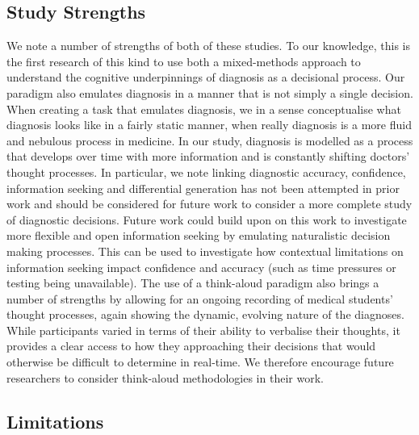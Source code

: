 \documentclass[a4paper, nobind]{templates/ociamthesis}
\begin{document}
\subsection*{Study Strengths}\label{study-strengths}

We note a number of strengths of both of these studies. To our knowledge, this is the first research of this kind to use both a mixed-methods approach to understand the cognitive underpinnings of diagnosis as a decisional process. Our paradigm also emulates diagnosis in a manner that is not simply a single decision. When creating a task that emulates diagnosis, we in a sense conceptualise what diagnosis looks like in a fairly static manner, when really diagnosis is a more fluid and nebulous process in medicine. In our study, diagnosis is modelled as a process that develops over time with more information and is constantly shifting doctors' thought processes. In particular, we note linking diagnostic accuracy, confidence, information seeking and differential generation has not been attempted in prior work and should be considered for future work to consider a more complete study of diagnostic decisions. Future work could build upon on this work to investigate more flexible and open information seeking by emulating naturalistic decision making processes. This can be used to investigate how contextual limitations on information seeking impact confidence and accuracy (such as time pressures or testing being unavailable). The use of a think-aloud paradigm also brings a number of strengths by allowing for an ongoing recording of medical students' thought processes, again showing the dynamic, evolving nature of the diagnoses. While participants varied in terms of their ability to verbalise their thoughts, it provides a clear access to how they approaching their decisions that would otherwise be difficult to determine in real-time. We therefore encourage future researchers to consider think-aloud methodologies in their work.

\subsection*{Limitations}\label{limitations}
\end{document}
